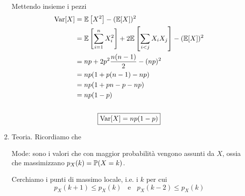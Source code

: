 \begin{enumerate}


Mettendo insieme i pezzi
\begin{gather*}
\begin{aligned}
\mathrm{Var}[ X] & =\mathbb{E}\left[ X^{2}\right] -(\mathbb{E}[ X])^{2}\\
 & =\mathbb{E}\left[\sum\limits _{i=1}^{n} X_{i}^{2}\right] +2\mathbb{E}\left[\sum\limits _{i< j} X_{i} X_{j}\right] -(\mathbb{E}[ X])^{2}\\
 & =np+2p^{2}\frac{n( n-1)}{2} -( np)^{2}\\
 & =np( 1+p( n-1) -np)\\
 & =np( 1+pn-p-np)\\
 & =np( 1-p)
\end{aligned}\\
\\
\boxed{\mathrm{Var}[ X] =np( 1-p)}
\end{gather*}
\item Teoria. Ricordiamo che

Mode: sono i valori che con maggior probabilità vengono assunti da $X$, ossia che massimizzano $p_{X}( k) =\mathbb{P}( X=k)$.

Cerchiamo i punti di massimo locale, i.e. i $k$ per cui
\begin{equation*}
\boxed{p_{X}( k+1) \leq p_{X}( k) \ \ \ \ \text{e} \ \ \ \ p_{X}( k-2) \leq p_{X}( k)}
\end{equation*}


\end{enumerate}
